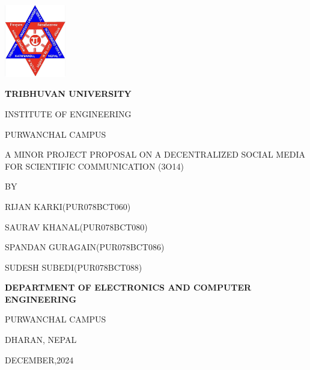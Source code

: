 \begin{titlepage}
    \centering
    
    \includegraphics[width=0.2\textwidth]{Graphics/TULogo.png}\par
    \vspace{1.2cm}
    {\fontsize{14pt}{12pt}\selectfont\bfseries\textcolor{black}
    TRIBHUVAN UNIVERSITY \par INSTITUTE OF ENGINEERING \par PURWANCHAL CAMPUS \par
    \vspace{1.2cm}
    \begin{flushleft}
    
    \end{flushleft}

    \par A MINOR PROJECT PROPOSAL ON A DECENTRALIZED SOCIAL MEDIA FOR SCIENTIFIC COMMUNICATION (3O14)\par

    \vspace{1.2cm}
    BY\par RIJAN KARKI(PUR078BCT060)
      \par SAURAV KHANAL(PUR078BCT080)
      \par SPANDAN GURAGAIN(PUR078BCT086)
      \par SUDESH SUBEDI(PUR078BCT088)
    \vspace{1.2cm}\par
    }
    {\fontsize{13pt}{12pt}\selectfont\bfseries\textcolor{black}
    DEPARTMENT OF ELECTRONICS AND COMPUTER ENGINEERING\par PURWANCHAL CAMPUS\par DHARAN, NEPAL\par
    \vspace{1.2cm}
    \vspace{1.2cm}
    
    DECEMBER,2024 
    }
\end{titlepage}


